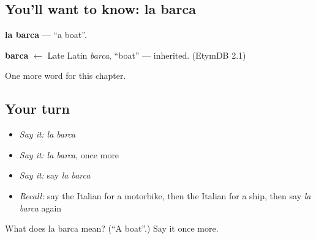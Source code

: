 \subsection*{You'll want to know: la barca}
\textbf{la barca} — \textquotedblleft{}a boat\textquotedblright{}.

\begin{cousinweb}
\textbf{barca} $\leftarrow$ Late Latin \emph{barca}, \textquotedblleft{}boat\textquotedblright{} — inherited. (EtymDB 2.1)
\end{cousinweb}

\begin{grammarlens}[title={What you've built}]
One more word for this chapter.
\end{grammarlens}

\subsection*{Your turn}
\begin{itemize}
\raggedright
  \item \emph{Say it:} \emph{la barca}
  \item \emph{Say it:} \emph{la barca}, once more
  \item \emph{Say it:} say \emph{la barca}
  \item \emph{Recall:} say the Italian for a motorbike, then the Italian for a ship, then say \emph{la barca} again
\end{itemize}

\begin{tcolorbox}[breakable,colback=teal!4,colframe=teal!35!black,title={Before you move on}]
What does la barca mean? (\textquotedblleft{}A boat\textquotedblright{}.) Say it once more.
\end{tcolorbox}
